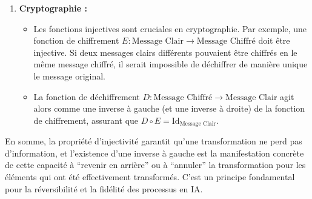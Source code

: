 \documentclass[12pt,a4paper]{report}
\providecommand{\tightlist}{%
  \setlength{\itemsep}{0pt}\setlength{\parskip}{0pt}}
\begin{document}
\begin{enumerate}
  \begin{itemize}
  \tightlist
  \item
    Les fonctions de hachage sont utilisées pour mapper des données de
    taille arbitraire à des valeurs de taille fixe (les ``hachages'').
    Elles sont fondamentales pour l'indexation de données (tables de
    hachage) et la vérification d'intégrité.
  \item
    Idéalement, une fonction de hachage ``parfaite'' serait injective
    sur l'ensemble des clés utilisées, c'est-à-dire qu'elle ne
    produirait jamais de collisions (deux clés différentes donnant le
    même hachage).
  \item
    Si une fonction de hachage \(h: K \to V\) (où \(K\) est l'ensemble
    des clés et \(V\) l'ensemble des valeurs de hachage) était
    injective, alors il existerait une fonction \(g: V \to K\) telle que
    \(g \circ h = \text{Id}_K\), permettant de retrouver la clé
    originale à partir de son hachage. En pratique, les fonctions de
    hachage ne sont pas injectives sur l'ensemble de toutes les entrées
    possibles, mais elles sont conçues pour minimiser les collisions sur
    l'ensemble des entrées attendues.
  \end{itemize}
\item
  \textbf{Cryptographie :}

  \begin{itemize}
  \tightlist
  \item
    Les fonctions injectives sont cruciales en cryptographie. Par
    exemple, une fonction de chiffrement
    \(E: \text{Message Clair} \to \text{Message Chiffré}\) doit être
    injective. Si deux messages clairs différents pouvaient être
    chiffrés en le même message chiffré, il serait impossible de
    déchiffrer de manière unique le message original.
  \item
    La fonction de déchiffrement
    \(D: \text{Message Chiffré} \to \text{Message Clair}\) agit alors
    comme une inverse à gauche (et une inverse à droite) de la fonction
    de chiffrement, assurant que
    \(D \circ E = \text{Id}_{\text{Message Clair}}\).
  \end{itemize}
\end{enumerate}

En somme, la propriété d'injectivité garantit qu'une transformation ne
perd pas d'information, et l'existence d'une inverse à gauche est la
manifestation concrète de cette capacité à ``revenir en arrière'' ou à
``annuler'' la transformation pour les éléments qui ont été
effectivement transformés. C'est un principe fondamental pour la
réversibilité et la fidélité des processus en IA.
\newpage
\end{document}
